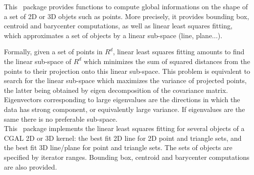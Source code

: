 This \cgal\ package provides functions to compute global informations
on the shape of a set of 2D or 3D objets such as points.
More precisely, it provides bounding box, centroid and barycenter computations,
as well as linear least squares fitting, which approximates a set
of objects by a linear sub-space (line, plane...).

Formally, given a set of points in $R^d$, linear least squares fitting amounts
to find the linear sub-space of $R^d$ which minimizes the sum of squared
distances from the points to their projection onto this linear sub-space. This
problem is equivalent to search for the linear sub-space which maximizes the
variance of projected points, the latter being obtained by eigen decomposition
of the covariance matrix. Eigenvectors corresponding to large eigenvalues are
the directions in which the data has strong component, or equivalently large
variance. If eigenvalues are the same there is no preferable sub-space.\\

This \cgal\ package implements the linear least squares fitting for
several objects of a CGAL 2D or 3D kernel: the best fit 2D line for 2D
point and triangle sets, and the best fit 3D line/plane for point and
triangle sets.  The sets of objects are specified by iterator ranges.
Bounding box, centroid and barycenter computations are also provided.

